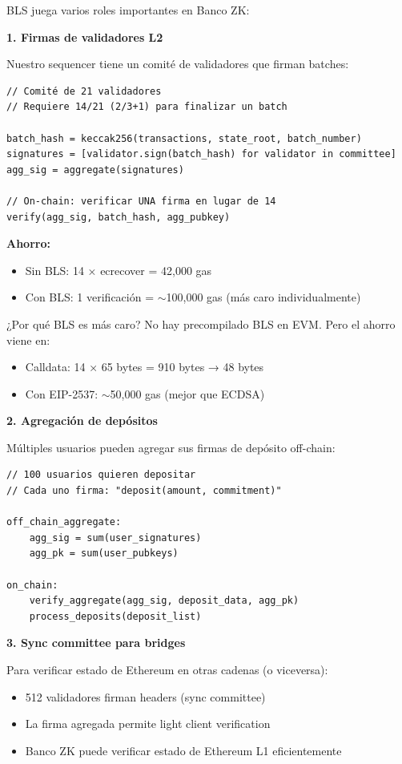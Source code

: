 \documentclass[11pt,a4paper,twoside,openright]{book}
\theoremstyle{definition}
\theoremstyle{plain}
\theoremstyle{remark}
\begin{document}
\begin{bancozk}
BLS juega varios roles importantes en Banco ZK:

\textbf{1. Firmas de validadores L2}

Nuestro sequencer tiene un comité de validadores que firman batches:
\begin{verbatim}
// Comité de 21 validadores
// Requiere 14/21 (2/3+1) para finalizar un batch

batch_hash = keccak256(transactions, state_root, batch_number)
signatures = [validator.sign(batch_hash) for validator in committee]
agg_sig = aggregate(signatures)

// On-chain: verificar UNA firma en lugar de 14
verify(agg_sig, batch_hash, agg_pubkey)
\end{verbatim}

\textbf{Ahorro:}
\begin{itemize}
    \item Sin BLS: 14 × ecrecover = 42,000 gas
    \item Con BLS: 1 verificación = $\sim$100,000 gas (más caro individualmente)
\end{itemize}

¿Por qué BLS es más caro? No hay precompilado BLS en EVM. Pero el ahorro viene en:
\begin{itemize}
    \item Calldata: 14 × 65 bytes = 910 bytes → 48 bytes
    \item Con EIP-2537: $\sim$50,000 gas (mejor que ECDSA)
\end{itemize}

\textbf{2. Agregación de depósitos}

Múltiples usuarios pueden agregar sus firmas de depósito off-chain:
\begin{verbatim}
// 100 usuarios quieren depositar
// Cada uno firma: "deposit(amount, commitment)"

off_chain_aggregate:
    agg_sig = sum(user_signatures)
    agg_pk = sum(user_pubkeys)
    
on_chain:
    verify_aggregate(agg_sig, deposit_data, agg_pk)
    process_deposits(deposit_list)
\end{verbatim}

\textbf{3. Sync committee para bridges}

Para verificar estado de Ethereum en otras cadenas (o viceversa):
\begin{itemize}
    \item 512 validadores firman headers (sync committee)
    \item La firma agregada permite light client verification
    \item Banco ZK puede verificar estado de Ethereum L1 eficientemente
\end{itemize}


\end{bancozk}
\end{document}
